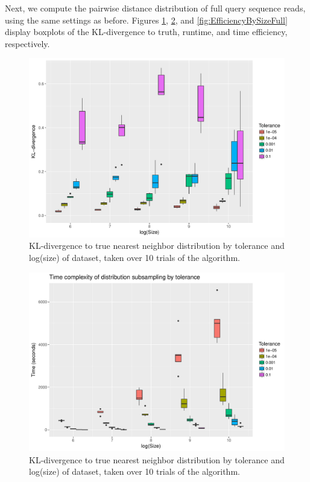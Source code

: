 \documentclass{article}
\begin{document}
Next, we compute the pairwise distance distribution of full query sequence reads, using the same settings as before.
Figures \ref{fig:DivBySizeFull}, \ref{fig:TimeBySizeFull}, and \ref{fig:EfficiencyBySizeFull} display boxplots of the KL-divergence to truth, runtime, and time efficiency, respectively.
\begin{figure}
    \includegraphics[width=\linewidth]{Figures/NearestNeighbor/div_by_size_and_tol.pdf}
    \caption{KL-divergence to true nearest neighbor distribution by tolerance and log(size) of dataset, taken over 10 trials of the algorithm.}
    \label{fig:DivBySizeFull}
\end{figure}
\begin{figure}
    \includegraphics[width=\linewidth]{Figures/NearestNeighbor/time_by_size_and_tol.pdf}
    \caption{KL-divergence to true nearest neighbor distribution by tolerance and log(size) of dataset, taken over 10 trials of the algorithm.}
    \label{fig:TimeBySizeFull}
\end{figure}
\end{document}
